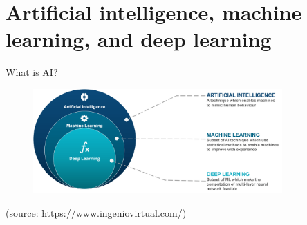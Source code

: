 \documentclass[10pt,aspectratio=169,dvipsnames]{beamer} %
\begin{document}
	\section{Artificial intelligence, machine learning, and deep learning}
	\begin{frame}{What is AI?}
		\begin{figure}
				\centering
				\includegraphics[width=0.85\textwidth]{AI_vs_ML_vs_Deep_Learning.png}
			\end{figure}
		\tiny
		(source: https://www.ingeniovirtual.com/)
	\end{frame}
\end{document}
